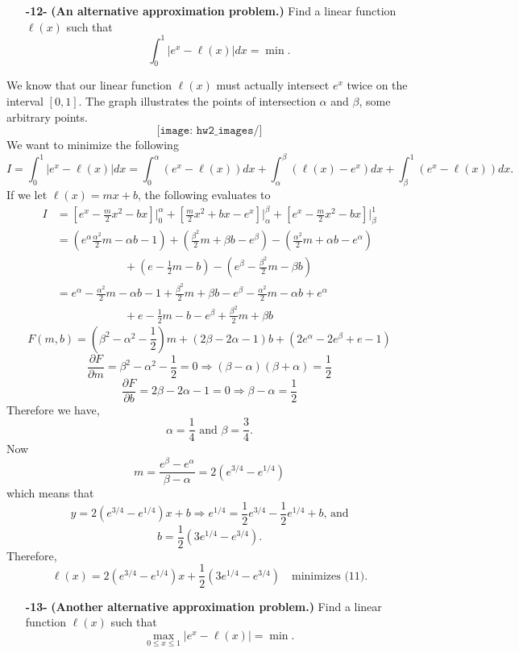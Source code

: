 \documentclass[11pt]{article}
\theoremstyle{definition}
\newcommand{\1}[1]{\mathbf{1} \left \{ #1 \right \}}
\begin{document}
\begin{itemize}
    \item[{\textbf{-12-}}] \textbf{(An alternative approximation problem.)}  Find a linear function $\ell(x)$ such that
    \begin{equation}
        \int_0^1 |e^x - \ell(x)| dx = \min.
    \end{equation}
\end{itemize}
We know that our linear function $\ell(x)$ must actually intersect $e^x$ twice on the interval $[0,1]$.  The graph illustrates the points of intersection $\alpha$ and $\beta$, some arbitrary points.
\[\texttt{[image: hw2\_images/]}\]
We want to minimize the following
\[I = \int_0^1 |e^x - \ell(x)| dx = \int_0^{\alpha} (e^x - \ell(x)) dx + \int_{\alpha}^{\beta} (\ell(x) - e^x) dx + \int_{\beta}^1 (e^x - \ell(x)) dx.\]
If we let $\ell(x) = mx+b$, the following evaluates to
\begin{equation*}
    \begin{split}
        I &= \left[e^x - \frac{m}{2}x^2 - bx\right]\bigg|_0^{\alpha} + \left[\frac{m}{2}x^2 + bx - e^x\right]\bigg|_{\alpha}^{\beta} + \left[e^x - \frac{m}{2}x^2 - bx\right]\bigg|_{\beta}^1 \\
        &= \left(e^{\alpha} \frac{\alpha^2}{2}m - \alpha b - 1\right) + \left(\frac{\beta^2}{2}m + \beta b - e^{\beta}\right) - \left(\frac{\alpha^2}{2}m + \alpha b - e^{\alpha}\right) \\
        & \qquad \qquad \qquad + \left(e - \frac{1}{2}m - b\right) - \left(e^{\beta} - \frac{\beta^2}{2}m - \beta b\right) \\
        &= e^{\alpha} - \frac{\alpha^2}{2}m - \alpha b - 1 + \frac{\beta^2}{2}m + \beta b - e^{\beta} - \frac{\alpha^2}{2}m - \alpha b + e^{\alpha} \\
        & \qquad \qquad \qquad + e - \frac{1}{2}m - b - e^{\beta} + \frac{\beta^2}{2}m + \beta b
    \end{split}
\end{equation*}
\[F(m,b) = \left(\beta^2 - \alpha^2 - \frac{1}{2}\right)m + \left(2\beta - 2\alpha - 1\right)b + \left(2e^{\alpha} - 2e^{\beta} + e - 1\right)\]
\[\frac{\partial F}{\partial m} = \beta^2 - \alpha^2 - \frac{1}{2} = 0 \Longrightarrow (\beta - \alpha)(\beta + \alpha) = \frac{1}{2}\]
\[\frac{\partial F}{\partial b} = 2\beta - 2\alpha - 1 = 0 \Longrightarrow \beta - \alpha = \frac{1}{2}\]
Therefore we have,
\[\alpha = \frac{1}{4} \text{  and  } \beta = \frac{3}{4}.\]
Now
\[m = \frac{e^{\beta} - e^{\alpha}}{\beta - \alpha} = 2\left(e^{3/4} - e^{1/4}\right)\]
which means that
\[y = 2\left(e^{3/4} - e^{1/4}\right)x + b \Longrightarrow e^{1/4} = \frac{1}{2}e^{3/4} - \frac{1}{2}e^{1/4} + b \text{, and}\]
\[b = \frac{1}{2}\left(3e^{1/4} - e^{3/4}\right).\]
Therefore,
\[\ell(x) = 2\left(e^{3/4} - e^{1/4}\right)x + \frac{1}{2}\left(3e^{1/4} - e^{3/4}\right) \quad \text{minimizes (11).}\]

\begin{itemize}
    \item[{\textbf{-13-}}] \textbf{(Another alternative approximation problem.)}  Find a linear function $\ell(x)$ such that
    \begin{equation}
        \max_{0 \leq x \leq 1} |e^x - \ell(x)| = \min.
    \end{equation}
\end{itemize}
\end{document}
